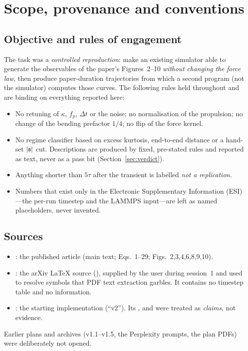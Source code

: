 \documentclass[11pt]{article}
\begin{document}
\tableofcontents
\newpage

\section{Scope, provenance and conventions}
\subsection{Objective and rules of engagement}
The task was a \emph{controlled reproduction}: make an existing simulator able to generate the
observables of the paper's Figures~2--10 \emph{without changing the force law}, then produce
paper-duration trajectories from which a second program (not the simulator) computes those curves.
The following rules held throughout and are binding on everything reported here:
\begin{itemize}
\item No retuning of $\kappa$, $f_p$, $\Delta t$ or the noise; no normalisation of the propulsion; no change of the
bending prefactor $1/4$; no flip of the force kernel.
\item No regime classifier based on excess kurtosis, end-to-end distance or a hand-set $|\mathfrak{s}|$ cut.
Descriptions are produced by fixed, pre-stated rules and reported as text, never as a pass bit
(Section~\ref{sec:verdict}).
\item Anything shorter than $5\tau$ after the transient is labelled \emph{not a replication}.
\item Numbers that exist only in the Electronic Supplementary Information (ESI)---the per-run timestep and
the LAMMPS input---are left as named placeholders, never invented.
\end{itemize}

\subsection{Sources}
\begin{itemize}
\item {}: the published article (main text; Eqs.~1--29; Figs.~2,3,4,6,8,9,10).
\item {}: the arXiv \LaTeX{} source (), supplied by the user
during session~1 and used to resolve symbols that PDF text extraction garbles. It contains no timestep table and
no  information.
\item {}: the starting implementation (``v2'').
Its ,  and  were treated as \emph{claims}, not evidence.
\end{itemize}
Earlier plans and archives (v1.1--v1.5, the Perplexity prompts, the plan PDFs) were deliberately not opened.
\end{document}

